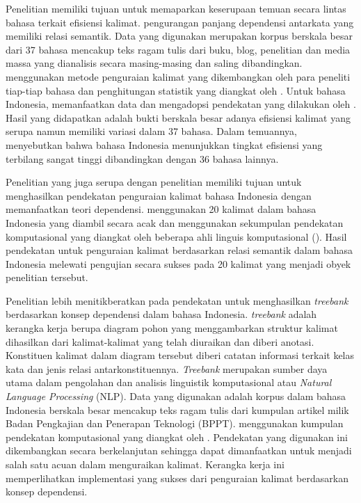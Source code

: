 Penelitian \cite{futrell2015large} memiliki tujuan untuk memaparkan keserupaan temuan secara lintas bahasa terkait efisiensi kalimat. pengurangan panjang dependensi antarkata yang memiliki relasi semantik. Data yang digunakan merupakan korpus berskala besar dari 37 bahasa mencakup teks ragam tulis dari buku, blog, penelitian dan media massa yang dianalisis secara masing-masing dan saling dibandingkan. \cite{futrell2015large} menggunakan metode penguraian kalimat yang dikembangkan oleh para peneliti tiap-tiap bahasa dan penghitungan statistik yang diangkat oleh \cite{gelman2007data}. Untuk bahasa Indonesia, \cite{futrell2015large} memanfaatkan data dan mengadopsi pendekatan yang dilakukan oleh \cite{green2012indonesian}. Hasil yang didapatkan adalah bukti berskala besar adanya efisiensi kalimat yang serupa namun memiliki variasi dalam 37 bahasa. Dalam temuannya, \cite{futrell2015large} menyebutkan bahwa bahasa Indonesia menunjukkan tingkat efisiensi yang terbilang sangat tinggi dibandingkan dengan 36 bahasa lainnya. 

Penelitian \cite{green2012indonesian} yang juga serupa dengan penelitian \cite{kamayani2011dependency} memiliki tujuan untuk menghasilkan pendekatan penguraian kalimat bahasa Indonesia dengan memanfaatkan teori dependensi. \cite{kamayani2011dependency} menggunakan 20 kalimat dalam bahasa Indonesia yang diambil secara acak dan menggunakan sekumpulan pendekatan komputasional yang diangkat oleh beberapa ahli linguis komputasional (\citealp{nivre2006dependency, covington2001fundamental, de2008stanford, de2014universal}). Hasil pendekatan untuk penguraian kalimat berdasarkan relasi semantik dalam bahasa Indonesia melewati pengujian secara sukses pada 20 kalimat yang menjadi obyek penelitian tersebut.

Penelitian \cite{green2012indonesian} lebih menitikberatkan pada pendekatan untuk menghasilkan \textit{treebank} berdasarkan konsep dependensi dalam bahasa Indonesia. \textit{treebank} adalah kerangka kerja berupa diagram pohon yang menggambarkan struktur kalimat dihasilkan dari kalimat-kalimat yang telah diuraikan dan diberi anotasi. Konstituen kalimat dalam diagram tersebut diberi catatan informasi terkait kelas kata dan jenis relasi antarkonstituennya. \textit{Treebank} merupakan sumber daya utama dalam pengolahan dan analisis linguistik komputasional atau \textit{Natural Language Processing} (NLP). Data yang digunakan adalah korpus dalam bahasa Indonesia berskala besar mencakup teks ragam tulis dari kumpulan artikel milik Badan Pengkajian dan Penerapan Teknologi (BPPT). \cite{green2012indonesian} menggunakan kumpulan pendekatan komputasional yang diangkat oleh \cite{kubler2009dependency}. Pendekatan yang digunakan \cite{green2012indonesian} ini dikembangkan secara berkelanjutan sehingga dapat dimanfaatkan untuk menjadi salah satu acuan dalam menguraikan kalimat. Kerangka kerja ini memperlihatkan implementasi yang sukses dari penguraian kalimat berdasarkan konsep dependensi.

